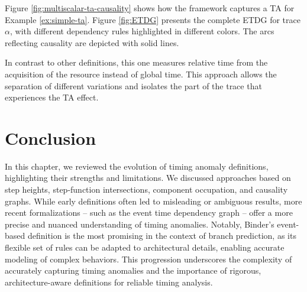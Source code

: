 Figure \ref{fig:multiscalar-ta-causality} shows how the framework captures a TA for Example \ref{ex:simple-ta}. Figure \ref{fig:ETDG} presents the complete ETDG for trace $\alpha$, with different dependency rules highlighted in different colors. The arcs reflecting causality are depicted with solid lines.

In contrast to other definitions, this one measures relative time from the acquisition of the resource instead of global time. This approach allows the separation of different variations and isolates the part of the trace that experiences the TA effect.


\section{Conclusion}

In this chapter, we reviewed the evolution of timing anomaly definitions, highlighting their strengths and limitations. We discussed approaches based on step heights, step-function intersections, component occupation, and causality graphs. While early definitions often led to misleading or ambiguous results, more recent formalizations -- such as the event time dependency graph -- offer a more precise and nuanced understanding of timing anomalies. Notably, Binder's event-based definition is the most promising in the context of branch prediction, as its flexible set of rules can be adapted to architectural details, enabling accurate modeling of complex behaviors. This progression underscores the complexity of accurately capturing timing anomalies and the importance of rigorous, architecture-aware definitions for reliable timing analysis.